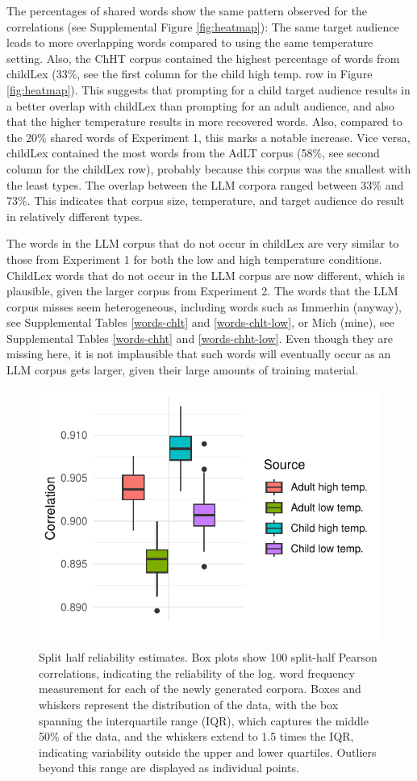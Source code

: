 \documentclass[doc, a4paper]{apa7}
\begin{document}
The percentages of shared words show the same pattern observed for the correlations (see Supplemental Figure \ref{fig:heatmap}): The same target audience leads to more overlapping words compared to using the same temperature setting. Also, the ChHT corpus contained the highest percentage of words from childLex (33\%, see the first column for the child high temp. row in Figure \ref{fig:heatmap}). This suggests that prompting for a child target audience results in a better overlap with childLex than prompting for an adult audience, and also that the higher temperature results in more recovered words. Also, compared to the 20\% shared words of Experiment 1, this marks a notable increase. Vice versa, childLex contained the most words from the AdLT corpus (58\%, see second column for the childLex row), probably because this corpus was the smallest with the least types. The overlap between the LLM corpora ranged between 33\% and 73\%. This indicates that corpus size, temperature, and target audience do result in relatively different types.  

The words in the LLM corpus that do not occur in childLex are very similar to those from Experiment 1 for both the low and high temperature conditions. ChildLex words that do not occur in the LLM corpus are now different, which is plausible, given the larger corpus from Experiment 2. The words that the LLM corpus misses seem heterogeneous, including words such as Immerhin (anyway), see Supplemental Tables \ref{words-chlt} and \ref{words-chlt-low}, or Mich (mine), see Supplemental Tables \ref{words-chht} and \ref{words-chht-low}. Even though they are missing here, it is not implausible that such words will eventually occur as an LLM corpus gets larger, given their large amounts of training material. 


\begin{figure}[!htbp]
  \centerline{
    \includegraphics[width=.5\textwidth]{figures/boxplot-split-pearson.pdf}}
    \caption{Split half reliability estimates. Box plots show 100 split-half Pearson correlations, indicating the reliability of the log. word frequency measurement for each of the newly generated corpora. Boxes and whiskers represent the distribution of the data, with the box spanning the interquartile range (IQR), which captures the middle 50\% of the data, and the whiskers extend to 1.5 times the IQR, indicating variability outside the upper and lower quartiles. Outliers beyond this range are displayed as individual points.}
    \label{fig:reliablity}
\end{figure}
\end{document}
